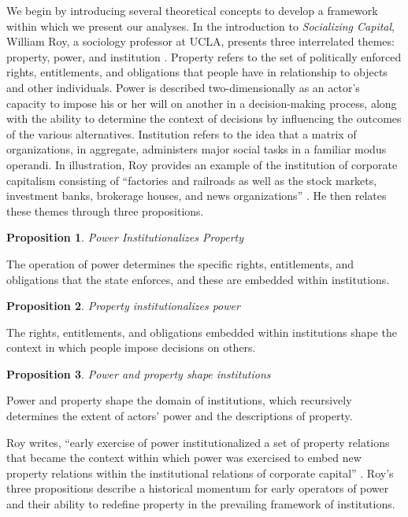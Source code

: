 \documentclass[12pt]{article}
\newtheorem{prpn}{Proposition}
\begin{document}
We begin by introducing several theoretical concepts to develop a framework within which we present our analyses. In the introduction to \textit{Socializing Capital}, William Roy, a sociology professor at UCLA, presents three interrelated themes: property, power, and institution \cite[Roy 12-15]{Roy}. Property refers to the set of politically enforced rights, entitlements, and obligations that people have in relationship to objects and other individuals. Power is described two-dimensionally as an actor's capacity to impose his or her will on another in a decision-making process, along with the ability to determine the context of decisions by influencing the outcomes of the various alternatives. Institution refers to the idea that a matrix of organizations, in aggregate, administers major social tasks in a familiar modus operandi. In illustration, Roy provides an example of the institution of corporate capitalism consisting of ``factories and railroads as well as the stock markets, investment banks, brokerage houses, and news organizations'' \cite[Roy 15]{Roy}. He then relates these themes through three propositions.

\begin{prpn}{Power Institutionalizes Property}\end{prpn}
\setlength{\leftskip}{2cm}
\noindent The operation of power determines the specific rights, entitlements, and obligations that the state enforces, and these are embedded within institutions.

\begin{prpn}{Property institutionalizes power}\end{prpn}
\noindent The rights, entitlements, and obligations embedded within institutions shape the context in which people impose decisions on others.

\begin{prpn}{Power and property shape institutions}\end{prpn}
\noindent Power and property shape the domain of institutions, which recursively determines the extent of actors' power and the descriptions of property.

\setlength{\leftskip}{0pt}
\noindent Roy writes, ``early exercise of power institutionalized a set of property relations that became the context within which power was exercised to embed new property relations within the institutional relations of corporate capital'' \cite[Roy 16]{Roy}. Roy's three propositions describe a historical momentum for early operators of power and their ability to redefine property in the prevailing framework of institutions.
\end{document}
